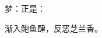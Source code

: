 \begin{parag}
    \begin{note}梦：正是：\end{note}
\end{parag}


\begin{parag}
    \begin{note}渐入鲍鱼肆，反恶芝兰香。\end{note}
\end{parag}

